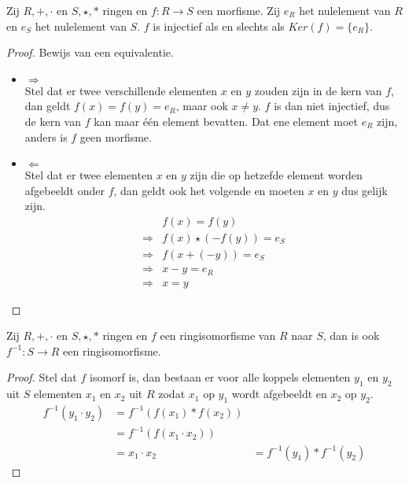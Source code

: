 \documentclass[main.tex]{subfiles}
\begin{document}
\begin{ei}
  \label{ei:ringmorfisme-injectief-asa-kern-nul}
  Zij $R,+,\cdot$ en $S,\star,*$ ringen en $f:R \rightarrow S$ een morfisme.
  Zij $e_{R}$ het nulelement van $R$ en $e_{S}$ het nulelement van $S$.
  $f$ is injectief als en slechts als $Ker(f) = \{e_{R}\}$.

  \begin{proof}
    Bewijs van een equivalentie.
    \begin{itemize}
    \item $\Rightarrow$\\
      Stel dat er twee verschillende elementen $x$ en $y$ zouden zijn in de kern van $f$, dan geldt $f(x) = f(y) = e_{R}$, maar ook $x \neq y$.
      $f$ is dan niet injectief, dus de kern van $f$ kan maar \'e\'en element bevatten.
      Dat ene element moet $e_{R}$ zijn, anders is $f$ geen morfisme.
    \item $\Leftarrow$\\
      Stel dat er twee elementen $x$ en $y$ zijn die op hetzefde element worden afgebeeldt onder $f$, dan geldt ook het volgende en moeten $x$ en $y$ dus gelijk zijn.
      \[
      \begin{array}{rl}
        & f(x) = f(y)\\ 
        \Rightarrow & f(x) \star (-f(y)) = e_{S}\\
        \Rightarrow & f(x + (-y)) = e_{S} \\
        \Rightarrow & x-y = e_{R} \\
        \Rightarrow & x = y
      \end{array}
      \]
    \end{itemize}
  \end{proof}
\end{ei}

\begin{ei}
  \label{ei:inverse-afbeelding-ook-isomorfisme}
  Zij $R,+,\cdot$ en $S,\star,*$ ringen en $f$ een ringisomorfisme van $R$ naar $S$, dan is ook $f^{-1}: S \rightarrow R$ een ringisomorfisme.

  \begin{proof}
    Stel dat $f$ isomorf is, dan bestaan er voor alle koppels elementen $y_{1}$ en $y_{2}$ uit $S$ elementen $x_{1}$ en $x_{2}$ uit $R$ zodat $x_{1}$ op $y_{1}$ wordt afgebeeldt en $x_{2}$ op $y_{2}$.
    \[
    \begin{array}{rll}
    f^{-1}(y_{1}\cdot y_{2}) &= f^{-1}(f(x_{1})*f(x_{2})) &\\
                           &= f^{-1}(f(x_{1} \cdot x_{2})) &\\
                           &= x_{1} \cdot x_{2} &= f^{-1}(y_{1}) * f^{-1}(y_{2})
    \end{array}
    \]
  \end{proof}
\end{ei}
\end{document}
